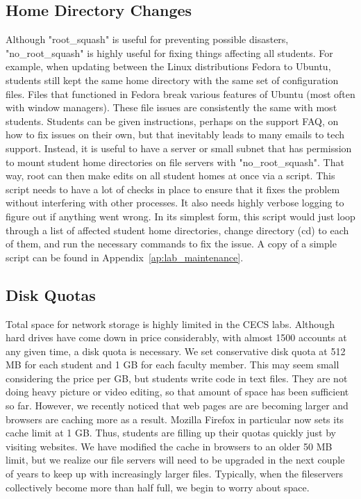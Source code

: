 \subsection{Home Directory Changes}
Although "root\_squash" is useful for preventing possible disasters, "no\_root\_squash" is highly useful for fixing things affecting all students.  For example, when updating between the Linux distributions Fedora to Ubuntu, students still kept the same home directory with the same set of configuration files.  Files that functioned in Fedora break various features of Ubuntu (most often with window managers).  These file issues are consistently the same with most students. Students can be given instructions, perhaps on the support FAQ, on how to fix issues on their own, but that inevitably leads to many emails to tech support.  Instead, it is useful to have a server or small subnet that has permission to mount student home directories on file servers with "no\_root\_squash".  That way, root can then make edits on all student homes at once via a script.  This script needs to have a lot of checks in place to ensure that it fixes the problem without interfering with other processes.  It also needs highly verbose logging to figure out if anything went wrong.  In its simplest form, this script would just loop through a list of affected student home directories, change directory (cd) to each of them, and run the necessary commands to fix the issue.  A copy of a simple script can be found in Appendix~\ref{ap:lab_maintenance}.

\subsection{Disk Quotas}
Total space for network storage is highly limited in the CECS labs.  Although hard drives have come down in price considerably, with almost 1500 accounts at any given time, a disk quota is necessary.  We set conservative disk quota at 512 MB for each student and 1 GB for each faculty member.  This may seem small considering the price per GB, but students write code in text files.  They are not doing heavy picture or video editing, so that amount of space has been sufficient so far.  However, we recently noticed that web pages are are becoming larger and browsers are caching more as a result.  Mozilla Firefox in particular now sets its cache limit at 1 GB.  Thus, students are filling up their quotas quickly just by visiting websites.  We have modified the cache in browsers to an older 50 MB limit, but we realize our file servers will need to be upgraded in the next couple of years to keep up with increasingly larger files.  Typically, when the fileservers collectively become more than half full, we begin to worry about space.  


